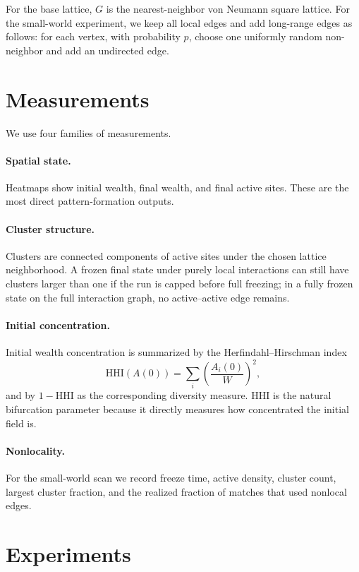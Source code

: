 \documentclass[11pt]{article}
\begin{document}
For the base lattice, $G$ is the nearest-neighbor von Neumann square lattice. For the small-world experiment, we keep all local edges and add long-range edges as follows: for each vertex, with probability $p$, choose one uniformly random non-neighbor and add an undirected edge.

\section{Measurements}

We use four families of measurements.

\paragraph{Spatial state.}
Heatmaps show initial wealth, final wealth, and final active sites. These are the most direct pattern-formation outputs.

\paragraph{Cluster structure.}
Clusters are connected components of active sites under the chosen lattice neighborhood. A frozen final state under purely local interactions can still have clusters larger than one if the run is capped before full freezing; in a fully frozen state on the full interaction graph, no active--active edge remains.

\paragraph{Initial concentration.}
Initial wealth concentration is summarized by the Herfindahl--Hirschman index
\[
  \mathrm{HHI}(A(0)) = \sum_i \left(\frac{A_i(0)}{W}\right)^2,
\]
and by $1-\mathrm{HHI}$ as the corresponding diversity measure. HHI is the natural bifurcation parameter because it directly measures how concentrated the initial field is.

\paragraph{Nonlocality.}
For the small-world scan we record freeze time, active density, cluster count, largest cluster fraction, and the realized fraction of matches that used nonlocal edges.

\section{Experiments}
\end{document}
